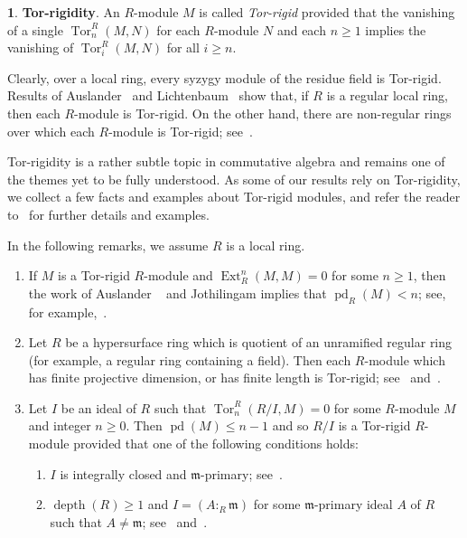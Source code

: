 \documentclass[11pt]{amsart}
\theoremstyle{definition}
\theoremstyle{definition}
\newtheorem{chunk}[thm]{\hspace*{-1.065ex}\bf}
\numberwithin{equation}{section}
\newcommand{\fm}{\mathfrak{m}}
\DeclareMathOperator{\depth}{depth}
\DeclareMathOperator{\Ext}{Ext}
\DeclareMathOperator{\pd}{pd}
\DeclareMathOperator{\Tor}{Tor}
\begin{document}
\begin{chunk} \textbf{Tor-rigidity}. \label{TorRigid} An $R$-module $M$ is called \emph{Tor-rigid} provided that the vanishing of a single $\Tor^R_n(M,N)$ for each $R$-module $N$ and each $n\geq 1$ implies the vanishing of $\Tor^R_i(M,N)$ for all $i\geq n$. 

Clearly, over a local ring, every syzygy module of the residue field is Tor-rigid. Results of Auslander~\cite{Au} and Lichtenbaum~\cite{Li} show that, if $R$ is a regular local ring, then each $R$-module is Tor-rigid. On the other hand, there are non-regular rings over which each $R$-module is Tor-rigid; see~\cite[2.8 and 3.16]{Da1}. 

Tor-rigidity is a rather subtle topic in commutative algebra and remains one of the themes yet to be fully understood. As some of our results rely on Tor-rigidity, we collect a few facts and examples about Tor-rigid modules, and refer the reader to~\cite{CeRo, DaoSurvey} for further details and examples. 

In the following remarks, we assume $R$ is a local ring.

\begin{enumerate}[\rm(i)] 
\item If $M$ is a Tor-rigid $R$-module and $\Ext^n_R(M,M)=0$ for some $n\geq 1$, then the work of Auslander ~\cite{Au} and Jothilingam \cite{Jot} implies that $\pd_R(M)<n$; see, for example,~\cite[3.1.2]{DaoSurvey}.
\item Let $R$ be a hypersurface ring which is quotient of an unramified regular ring (for example, a regular ring containing a field). Then each $R$-module which has finite projective dimension, or has finite length is Tor-rigid; see~\cite[2.4]{HW1} and~\cite[Thm. 2]{Li}.  
\item Let $I$ be an ideal of $R$ such that $\Tor^R_n(R/I,M)=0$ for some $R$-module $M$ and integer $n\geq 0$. Then $\pd(M)\leq n-1$ and so $R/I$ is a Tor-rigid $R$-module provided that one of the following conditions holds:
\begin{enumerate}[\rm(a)] 
\item $I$ is integrally closed and $\fm$-primary; see~\cite[3.3]{CHKV}.
\item $\depth(R)\geq 1$ and $I=(A:_R\fm)$ for some $\fm$-primary ideal $A$ of $R$ such that  $A\neq \fm$; see~\cite[2.2]{CSTT} and~\cite[2.9 and 2.10]{CeTos}.
\end{enumerate}
\end{enumerate}
\end{chunk}
\end{document}
